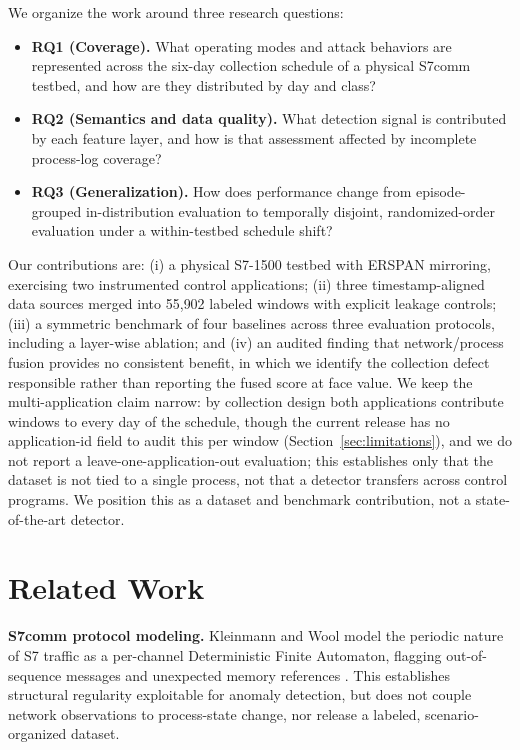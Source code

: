\documentclass[conference]{IEEEtran}
\begin{document}
We organize the work around three research questions:
\begin{itemize}
\item \textbf{RQ1 (Coverage).} What operating modes and attack behaviors are represented across the
six-day collection schedule of a physical S7comm testbed, and how are they distributed by day and class?
\item \textbf{RQ2 (Semantics and data quality).} What detection signal is contributed by each feature
layer, and how is that assessment affected by incomplete process-log coverage?
\item \textbf{RQ3 (Generalization).} How does performance change from episode-grouped in-distribution
evaluation to temporally disjoint, randomized-order evaluation under a within-testbed schedule shift?
\end{itemize}

Our contributions are: (i) a physical S7-1500 testbed with ERSPAN mirroring, exercising two instrumented
control applications; (ii) three timestamp-aligned data sources merged into 55{,}902 labeled windows with
explicit leakage controls; (iii) a symmetric benchmark of four baselines across three evaluation
protocols, including a layer-wise ablation; and (iv) an audited finding that network/process fusion
provides no consistent benefit, in which we identify the collection defect responsible rather than
reporting the fused score at face value. We keep the multi-application claim narrow: by collection design
both applications contribute windows to every day of the schedule, though the current release has no
application-id field to audit this per window (Section~\ref{sec:limitations}), and we do not report a
leave-one-application-out evaluation; this establishes only that the dataset is not tied to a single
process, not that a detector transfers across control programs. We position this as a dataset and
benchmark contribution, not a state-of-the-art detector.

\section{Related Work}

\textbf{S7comm protocol modeling.} Kleinmann and Wool model the periodic nature of S7 traffic as a
per-channel Deterministic Finite Automaton, flagging out-of-sequence messages and unexpected memory
references \cite{b2}. This establishes structural regularity exploitable for anomaly detection, but does
not couple network observations to process-state change, nor release a labeled, scenario-organized
dataset.
\end{document}
